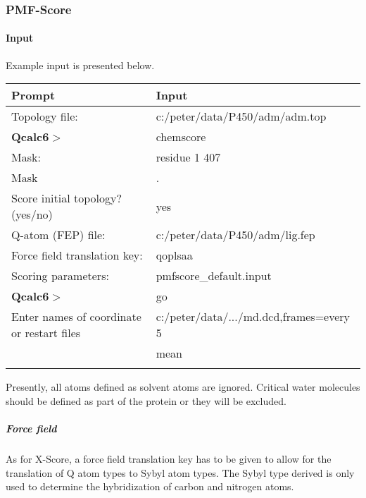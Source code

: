 \documentclass[a4paper,11pt]{article}
\begin{document}
 \subsubsection{PMF-Score}
 \paragraph{Input}
   Example input is presented below.

   \begin{minipage}[t]{0.2\textwidth}
    \centering
    \begin{tabular}{ll}
      Prompt                        & Input     \\
      \hline
      Topology file:                & c:/peter/data/P450/adm/adm.top  \\
      \textbf{Qcalc6}$>$                        & chemscore    \\
      Mask:                         & residue 1 407       \\
      Mask                          & .         \\

      Score initial topology? (yes/no) & yes                                  \\
      Q-atom (FEP) file:               & c:/peter/data/P450/adm/lig.fep  \\
      Force field translation key:  & qoplsaa \\
      Scoring parameters:           & pmfscore\_default.input \\
      \textbf{Qcalc6}$>$                         & go                                   \\
      Enter names of coordinate or restart files & c:/peter/data/.../md.dcd,frames=every 5 \\
                                   &  mean                                \\
      \hline
        & \\
    \end{tabular}
    \label{xinput}
  \end{minipage}

  Presently, all atoms defined as solvent atoms are ignored. Critical water molecules should be defined as part of the protein or they will be excluded.

  \subparagraph{Force field}
  As for X-Score, a force field translation key has to be given to allow for the translation of Q atom types to Sybyl atom types. The Sybyl type derived is only used to determine the hybridization of carbon and nitrogen atoms.
\end{document}
